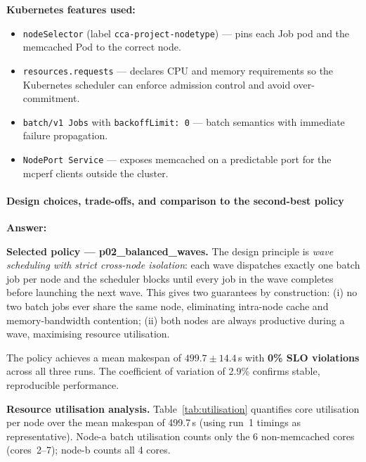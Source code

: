 \textbf{Kubernetes features used:}
\begin{itemize}
  \item \texttt{nodeSelector} (label \texttt{cca-project-nodetype}) — pins
    each Job pod and the memcached Pod to the correct node.
  \item \texttt{resources.requests} — declares CPU and memory requirements
    so the Kubernetes scheduler can enforce admission control and avoid
    over-commitment.
  \item \texttt{batch/v1 Jobs} with \texttt{backoffLimit: 0} — batch
    semantics with immediate failure propagation.
  \item \texttt{NodePort Service} — exposes memcached on a predictable
    port for the mcperf clients outside the cluster.
\end{itemize}

\paragraph{Design choices, trade-offs, and comparison to the second-best
policy}

\textbf{Answer:}

\textbf{Selected policy — p02\_balanced\_waves.}
The design principle is \emph{wave scheduling with strict cross-node
isolation}: each wave dispatches exactly one batch job per node and the
scheduler blocks until every job in the wave completes before launching
the next wave.
This gives two guarantees by construction: (i) no two batch jobs ever
share the same node, eliminating intra-node cache and memory-bandwidth
contention; (ii) both nodes are always productive during a wave, maximising
resource utilisation.

The policy achieves a mean makespan of $499.7 \pm 14.4$\,s with
\textbf{0\% SLO violations} across all three runs.
The coefficient of variation of 2.9\% confirms stable, reproducible
performance.

\textbf{Resource utilisation analysis.}
Table~\ref{tab:utilisation} quantifies core utilisation per node over the
mean makespan of 499.7\,s (using run~1 timings as representative).
Node-a batch utilisation counts only the 6 non-memcached cores (cores~2–7);
node-b counts all 4 cores.

